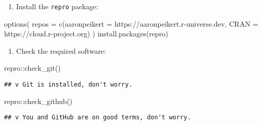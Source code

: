 \documentclass[psych,tutorial,accept,moreauthors,pdftex]{Definitions/mdpi}
\newenvironment{Shaded}{\begin{snugshade}}{\end{snugshade}}
\newcommand{\AttributeTok}[1]{\textcolor[rgb]{0.77,0.63,0.00}{#1}}
\newcommand{\FunctionTok}[1]{\textcolor[rgb]{0.00,0.00,0.00}{#1}}
\newcommand{\NormalTok}[1]{#1}
\newcommand{\SpecialCharTok}[1]{\textcolor[rgb]{0.00,0.00,0.00}{#1}}
\newcommand{\StringTok}[1]{\textcolor[rgb]{0.31,0.60,0.02}{#1}}
\begin{document}
\begin{paracol}{2}
\begin{enumerate}
\def\labelenumi{\arabic{enumi}.}
\item
  Install the \texttt{repro} package:
\end{enumerate}

\begin{adjustwidth}{0.5cm}{0cm} 
\begin{Shaded}
\begin{Highlighting}[]
\FunctionTok{options}\NormalTok{(}
  \AttributeTok{repos =} \FunctionTok{c}\NormalTok{(}\AttributeTok{aaronpeikert =} \StringTok{\textquotesingle{}https://aaronpeikert.r{-}universe.dev\textquotesingle{}}\NormalTok{,}
            \AttributeTok{CRAN =} \StringTok{\textquotesingle{}https://cloud.r{-}project.org\textquotesingle{}}\NormalTok{)}
\NormalTok{)}
\FunctionTok{install.packages}\NormalTok{(}\StringTok{\textquotesingle{}repro\textquotesingle{}}\NormalTok{)}
\end{Highlighting}
\end{Shaded}
\end{adjustwidth}

\begin{enumerate}
\def\labelenumi{\arabic{enumi}.}
\setcounter{enumi}{1}
\newpage
\item
  Check the required software:
\end{enumerate}

\begin{adjustwidth}{0.5cm}{0cm} 
\begin{Shaded}
\begin{Highlighting}[]
\NormalTok{repro}\SpecialCharTok{::}\FunctionTok{check\_git}\NormalTok{()}
\end{Highlighting}
\end{Shaded}

\begin{verbatim}
## v Git is installed, don't worry.
\end{verbatim}

\begin{Shaded}
\begin{Highlighting}[]
\NormalTok{repro}\SpecialCharTok{::}\FunctionTok{check\_github}\NormalTok{()}
\end{Highlighting}
\end{Shaded}

\begin{verbatim}
## v You and GitHub are on good terms, don't worry.
\end{verbatim}


\end{adjustwidth}
\end{paracol}
\end{document}
